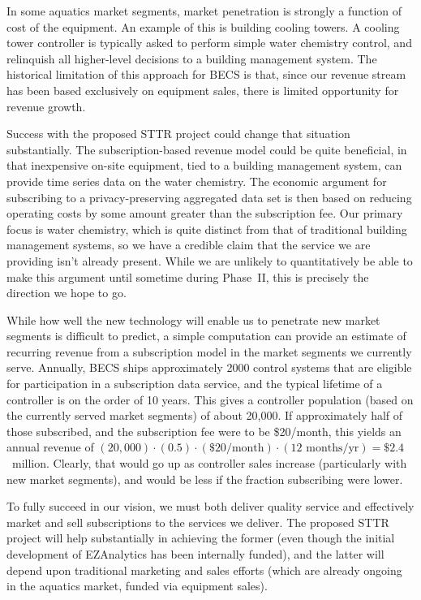 In some aquatics market segments, market penetration is strongly a function
of cost of the equipment.  An example of this is building cooling towers.
A cooling tower controller is typically asked to perform simple water
chemistry control, and relinquish all higher-level decisions to a
building management system. The historical limitation of this approach
for BECS is that, since our revenue stream has been based exclusively
on equipment sales, there is limited opportunity for revenue growth.

Success with the proposed STTR project could change that situation
substantially.  The subscription-based revenue model could be quite
beneficial, in that inexpensive on-site equipment, tied to a building
management system, can provide time series data on the water chemistry.
The economic argument for subscribing to a privacy-preserving aggregated
data set is then based on reducing operating costs by some amount
greater than the subscription fee.
Our primary focus is water chemistry, which is quite distinct from 
that of traditional
building management systems, so we have a credible claim that the service
we are providing isn't already present.
While we are unlikely to quantitatively
be able to make this argument until sometime during Phase~II, this is
precisely the direction we hope to go.

While how well the new technology will enable us to penetrate new
market segments is difficult to predict, a simple computation can provide
an estimate of recurring revenue from a subscription model in the
market segments we currently serve.
Annually, BECS ships approximately 2000 control systems that are
eligible for participation in a subscription data service, and the
typical lifetime of a controller is on the order of 10 years.  This gives
a controller population (based on the currently served market segments) of
about 20,000.  If approximately half of those subscribed, and the subscription
fee were to be \$20/month, this yields an annual revenue of
$(20,000)\cdot(0.5)\cdot(\$20/\mbox{month})\cdot(12\mbox{ months/yr}) = \$2.4$~million.
Clearly, that would go up as controller sales increase (particularly with
new market segments), and would be less if the fraction subscribing
were lower.

To fully succeed in our vision, we must both deliver quality service
and effectively market and sell subscriptions to the services we
deliver.  The proposed STTR project will help substantially in achieving
the former (even though the initial development of EZAnalytics\texttrademark{}
has been internally funded), and the latter will depend upon traditional
marketing and sales efforts (which are already ongoing in the aquatics
market, funded via equipment sales).
